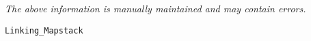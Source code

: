 \label{pkg:linking\_mapstack}

{\tiny \it The above information is manually maintained and may contain errors.}
\begin{verbatim}
Linking_Mapstack
\end{verbatim}
